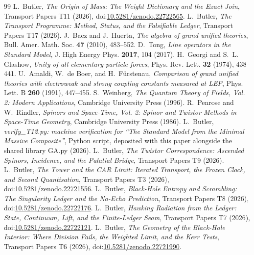 \documentclass[11pt]{article}
\theoremstyle{definition}
\theoremstyle{plain}
\begin{document}
\begin{thebibliography}{99}
 L.~Butler,
\emph{The Origin of Mass: The Weight Dictionary and the Exact Join},
Transport Papers T11 (2026), doi:\href{https://doi.org/10.5281/zenodo.22722565}{10.5281/zenodo.22722565}.
 L.~Butler,
\emph{The Transport Programme: Method, Status, and the Falsifiable Ledger},
Transport Papers T17 (2026).
 J.~Baez and J.~Huerta,
\emph{The algebra of grand unified theories},
Bull. Amer. Math. Soc. \textbf{47} (2010), 483--552.
 D.~Tong,
\emph{Line operators in the Standard Model},
J. High Energy Phys. \textbf{2017}, 104 (2017).
 H.~Georgi and S.~L. Glashow,
\emph{Unity of all elementary-particle forces},
Phys. Rev. Lett. \textbf{32} (1974), 438--441.
 U.~Amaldi, W.~de Boer, and H.~F\"urstenau,
\emph{Comparison of grand unified theories with electroweak and strong coupling constants measured at LEP},
Phys. Lett. B \textbf{260} (1991), 447--455.
 S.~Weinberg,
\emph{The Quantum Theory of Fields, Vol. 2: Modern Applications},
Cambridge University Press (1996).
 R.~Penrose and W.~Rindler,
\emph{Spinors and Space-Time, Vol. 2: Spinor and Twistor Methods in Space-Time Geometry},
Cambridge University Press (1986).
 L.~Butler,
\emph{verify\_T12.py: machine verification for ``The Standard Model from the Minimal Massive Composite''},
Python script, deposited with this paper alongside the shared library GA.py (2026).
 L.~Butler,
\emph{The Twistor Correspondence: Ascended Spinors, Incidence, and the Palatial Bridge},
Transport Papers T9 (2026).
 L.~Butler,
\emph{The Tower and the CAR Limit: Iterated Transport, the Frozen Clock, and Second Quantisation},
Transport Papers T3 (2026), doi:\href{https://doi.org/10.5281/zenodo.22721556}{10.5281/zenodo.22721556}.
 L.~Butler,
\emph{Black-Hole Entropy and Scrambling: The Singularity Ledger and the No-Echo Prediction},
Transport Papers T8 (2026), doi:\href{https://doi.org/10.5281/zenodo.22722176}{10.5281/zenodo.22722176}.
 L.~Butler,
\emph{Hawking Radiation from the Ledger: State, Continuum, Lift, and the Finite-Ledger Seam},
Transport Papers T7 (2026), doi:\href{https://doi.org/10.5281/zenodo.22722121}{10.5281/zenodo.22722121}.
 L.~Butler,
\emph{The Geometry of the Black-Hole Interior: Where Division Fails, the Weighted Limit, and the Kerr Tests},
Transport Papers T6 (2026), doi:\href{https://doi.org/10.5281/zenodo.22721990}{10.5281/zenodo.22721990}.

\end{thebibliography}
\end{document}
